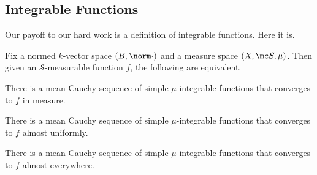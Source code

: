 \documentclass[../notes.tex]{subfiles}
\begin{document}
\subsection{Integrable Functions}
Our payoff to our hard work is a definition of integrable functions. Here it is.
\begin{theorem} \label{thm:int-funcs}
	Fix a normed $k$-vector space $(B,\norm\cdot)$ and a measure space $(X,\mc S,\mu)$. Then given an $\mathcal S$-measurable function $f$, the following are equivalent.
	\begin{listalph}
		\item There is a mean Cauchy sequence of simple $\mu$-integrable functions that converges to $f$ in measure.
		\item There is a mean Cauchy sequence of simple $\mu$-integrable functions that converges to $f$ almost uniformly.
		\item There is a mean Cauchy sequence of simple $\mu$-integrable functions that converges to $f$ almost everywhere.
	\end{listalph}
\end{theorem}
\end{document}
